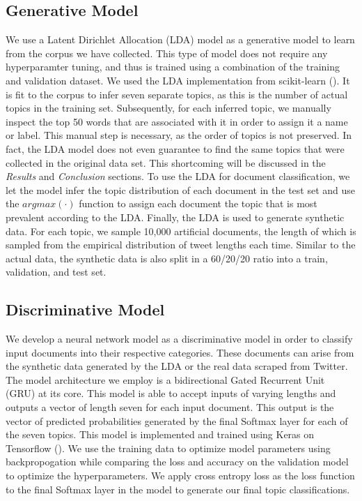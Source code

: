 \documentclass[11pt]{article}
\begin{document}
\subsection{Generative Model}
We use a Latent Dirichlet Allocation (LDA) model as a generative model to learn from the corpus we have collected. This type of model does not require any hyperparamter tuning, and thus is trained using a combination of the training and validation dataset. We used the LDA implementation from scikit-learn (\cite{sklearn}). It is fit to the corpus to infer seven separate topics, as this is the number of actual topics in the training set. Subsequently, for each inferred topic, we manually inspect the top 50 words that are associated with it in order to assign it a name or label. This manual step is necessary, as the order of topics is not preserved. In fact, the LDA model does not even guarantee to find the same topics that were collected in the original data set. This shortcoming will be discussed in the \emph{Results} and \emph{Conclusion} sections. 
To use the LDA for document classification,  we let the model infer the topic distribution of each document in the test set and use the $argmax(\cdot)$ function to assign each document the topic that is most prevalent according to the LDA.
Finally, the LDA is used to generate synthetic data. For each topic, we sample 10,000 artificial documents, the length of which is sampled from the empirical distribution of tweet lengths each time. Similar to the actual data, the synthetic data is also split in a 60/20/20 ratio into a train, validation, and test set.


\subsection{Discriminative Model}
We develop a neural network model as a discriminative model in order to classify input documents into their respective categories. These documents can arise from the synthetic data generated by the LDA or the real data scraped from Twitter. The model architecture we employ is a bidirectional Gated Recurrent Unit (GRU) at its core. This model is able to accept inputs of varying lengths and outputs a vector of length seven for each input document. This output is the vector of predicted probabilities generated by the final Softmax layer for each of the seven topics. This model is implemented and trained using Keras on Tensorflow (\cite{tensorflow}). We use the training data to optimize model parameters using backpropogation while comparing the loss and accuracy on the validation model to optimize the hyperparameters. We apply cross entropy loss as the loss function to the final Softmax layer in the model to generate our final topic classifications.
\end{document}
